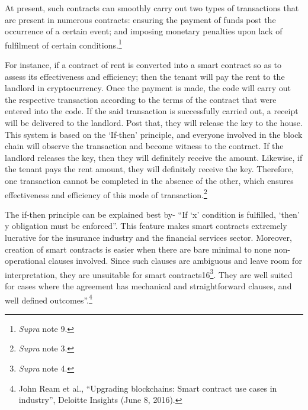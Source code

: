 \begin{multicols}{2}
\noi
At present, such contracts can smoothly carry out two types of transactions that are present in
numerous contracts: ensuring the payment of funds post the occurrence of a certain event;
and imposing monetary penalties upon lack of fulfilment of certain conditions.\footnote{\textit{Supra} note 9.}

\noi
For instance, if a contract of rent is converted into a smart contract so as to assess its
effectiveness and efficiency; then the tenant will pay the rent to the landlord in
cryptocurrency. Once the payment is made, the code will carry out the respective transaction
according to the terms of the contract that were entered into the code. If the said transaction is
successfully carried out, a receipt will be delivered to the landlord. Post that, they will release
the key to the house. This system is based on the ‘If-then’ principle, and everyone involved in
the block chain will observe the transaction and become witness to the contract. If the
landlord releases the key, then they will definitely receive the amount. Likewise, if the tenant
pays the rent amount, they will definitely receive the key. Therefore, one transaction cannot
be completed in the absence of the other, which ensures effectiveness and efficiency of this
mode of transaction.\footnote{\textit{Supra} note 3.}

\noi
The if-then principle can be explained best by- “If ‘x’ condition is fulfilled, ‘then’ y
obligation must be enforced”. This feature makes smart contracts extremely lucrative for the
insurance industry and the financial services sector. Moreover, creation of smart contracts is
easier when there are bare minimal to none non-operational clauses involved. Since such
clauses are ambiguous and leave room for interpretation, they are unsuitable for smart contracts16\footnote{\textit{Supra} note 4.}. They are well suited for cases where the agreement has mechanical and
straightforward clauses, and well defined outcomes”.\footnote{John Ream et al., “Upgrading blockchains: Smart contract use cases in industry”, Deloitte Insights (June 8,
2016).}


\end{multicols}
